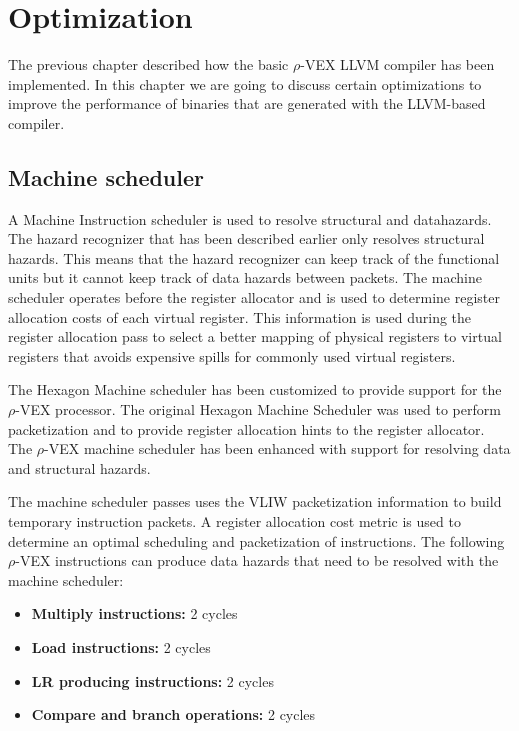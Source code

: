 \chapter{Optimization}
\label{chap:optimization}
The previous chapter described how the basic $\rho$-VEX LLVM compiler has been implemented. In this chapter we are going to discuss certain optimizations to improve the performance of binaries that are generated with the LLVM-based compiler.

\section{Machine scheduler}
A Machine Instruction scheduler is used to resolve structural and datahazards. The hazard recognizer that has been described earlier only resolves structural hazards. This means that the hazard recognizer can keep track of the functional units but it cannot keep track of data hazards between packets. The machine scheduler operates before the register allocator and is used to determine register allocation costs of each virtual register. This information is used during the register allocation pass to select a better mapping of physical registers to virtual registers that avoids expensive spills for commonly used virtual registers.

The Hexagon Machine scheduler has been customized to provide support for the $\rho$-VEX processor. The original Hexagon Machine Scheduler was used to perform packetization and to provide register allocation hints to the register allocator. The $\rho$-VEX machine scheduler has been enhanced with support for resolving data and structural hazards. 

The machine scheduler passes uses the VLIW packetization information to build temporary instruction packets. A register allocation cost metric is used to determine an optimal scheduling and packetization of instructions. The following $\rho$-VEX instructions can produce data hazards that need to be resolved with the machine scheduler:

\begin{itemize}
  \item \textbf{Multiply instructions:} 2 cycles
  \item \textbf{Load instructions:} 2 cycles
  \item \textbf{LR producing instructions:} 2 cycles
  \item \textbf{Compare and branch operations:} 2 cycles
\end{itemize}

